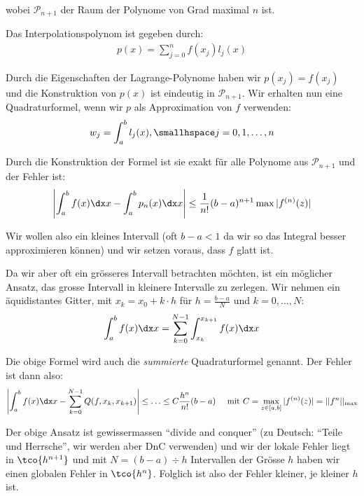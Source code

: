\vspace{-1.5pc}
wobei $\mathcal{P}_{n + 1}$ der Raum der Polynome von Grad maximal $n$ ist.

Das Interpolationspolynom ist gegeben durch:
\drmvspace
\begin{align*}
    p(x) = \sum_{j = 0}^{n} f(x_j) l_j(x)
\end{align*}

\drmvspace
Durch die Eigenschaften der Lagrange-Polynome haben wir $p(x_j) = f(x_j)$ und die Konstruktion von $p(x)$ ist eindeutig in $\mathcal{P}_{n + 1}$.
Wir erhalten nun eine Quadraturformel, wenn wir $p$ als Approximation von $f$ verwenden:
\rmvspace
\begin{align*}
    w_j = \int_{a}^{b} l_j(x), \smallhspace j = 0, 1, \ldots, n
\end{align*}

\drmvspace
Durch die Konstruktion der Formel ist sie exakt für alle Polynome aus $\mathcal{P}_{n + 1}$ und der Fehler ist:
\rmvspace
\begin{align*}
    \left| \int_{a}^{b} f(x) \dx x - \int_{a}^{b} p_n(x) \dx x \right| \leq \frac{1}{n!}(b - a)^{n + 1} \max|f^{(n)}(z)|
\end{align*}

\drmvspace
Wir wollen also ein kleines Intervall (oft $b - a < 1$ da wir so das Integral besser approximieren können) und wir setzen voraus, dass $f$ glatt ist.

Da wir aber oft ein grösseres Intervall betrachten möchten, ist ein möglicher Ansatz, das grosse Intervall in kleinere Intervalle zu zerlegen.
Wir nehmen ein äquidistantes Gitter, mit $x_k = x_0 + k \cdot h$ für $h = \frac{b - a}{N}$ und $k = 0, \ldots, N$:
\rmvspace
\begin{align*}
    \int_{a}^{b} f(x) \dx x = \sum_{k = 0}^{N - 1} \int_{x_k}^{x_{k + 1}} f(x) \dx x
\end{align*}

\drmvspace
Die obige Formel wird auch die \textit{summierte} Quadraturformel genannt. Der Fehler ist dann also:
\rmvspace
\begin{align*}
    \left| \int_{a}^{b} f(x) \dx x - \sum_{k = 0}^{N - 1} Q(f, x_k, x_{k + 1}) \right| \leq \ldots \leq C \frac{h^n}{n!}(b - a) &  &
    \text{ mit } C = \max_{z \in [a, b]} |f^{(n)}(z)| = ||f^n||_{\max}
\end{align*}

\rmvspace
Der obige Ansatz ist gewissermassen ``divide and conquer'' (zu Deutsch: ``Teile und Herrsche'', wir werden aber DnC verwenden)
und wir der lokale Fehler liegt in $\tco{h^{n + 1}}$ und mit $N = (b - a) \div h$ Intervallen der Grösse $h$ haben wir einen globalen Fehler in $\tco{h^n}$.
Folglich ist also der Fehler kleiner, je kleiner $h$ ist.

